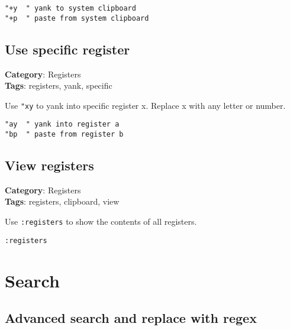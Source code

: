 {{{{{{{{{{\begin{Exa*}{}
\begin{Verbatim}[fontsize=\footnotesize, breaklines, breakanywhere]
"+y  " yank to system clipboard
"+p  " paste from system clipboard
\end{Verbatim}
\end{Exa*}

\section{Use specific register}

\textbf{Category}: Registers\\ \textbf{Tags}: registers, yank, specific
\vspace{0.5cm}

Use {\footnotesize \Verb§"xy§} to yank into specific register x. Replace x with any letter or number.

\begin{Exa*}{}
\begin{Verbatim}[fontsize=\footnotesize, breaklines, breakanywhere]
"ay  " yank into register a
"bp  " paste from register b
\end{Verbatim}
\end{Exa*}

\section{View registers}

\textbf{Category}: Registers\\ \textbf{Tags}: registers, clipboard, view
\vspace{0.5cm}

Use {\footnotesize \Verb§:registers§} to show the contents of all registers.

\begin{Exa*}{}
\begin{Verbatim}[fontsize=\footnotesize, breaklines, breakanywhere]
:registers
\end{Verbatim}
\end{Exa*}

\chapter{Search}
\section{Advanced search and replace with regex}

}}}}}}}}}}
